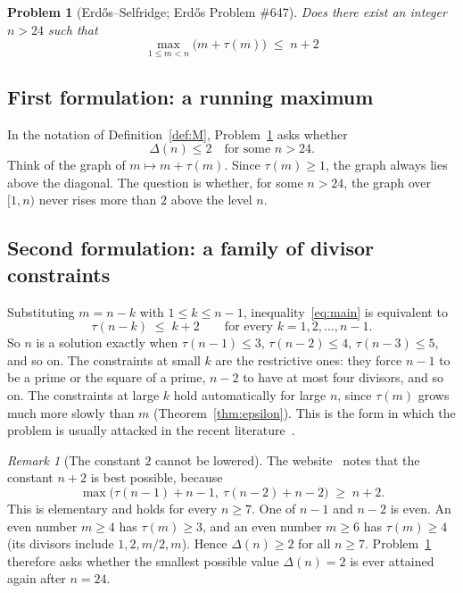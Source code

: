 \documentclass[11pt]{amsart}
\theoremstyle{plain}
\newtheorem{problem}[theorem]{Problem}
\theoremstyle{definition}
\theoremstyle{remark}
\newtheorem{remark}[theorem]{Remark}
\numberwithin{equation}{section}
\newcommand{\Dl}{\Delta}        %
\begin{document}
\begin{problem}[Erd\H{o}s--Selfridge; Erd\H{o}s Problem \#647]\label{prob:main}
Does there exist an integer $n>24$ such that
\begin{equation}\label{eq:main}
  \boxed{\;\max_{1\le m<n}\bigl(m+\tau(m)\bigr)\;\le\; n+2\;}
\end{equation}
\end{problem}

\subsection{First formulation: a running maximum}
In the notation of Definition~\ref{def:M}, Problem~\ref{prob:main} asks whether
\begin{equation}\label{eq:delta}
  \Dl(n)\le 2 \quad\text{for some } n>24.
\end{equation}
Think of the graph of $m\mapsto m+\tau(m)$. Since $\tau(m)\ge 1$, the graph always lies above the diagonal. The question is whether, for some $n>24$, the graph over $[1,n)$ never rises more than $2$ above the level $n$.

\subsection{Second formulation: a family of divisor constraints}
Substituting $m=n-k$ with $1\le k\le n-1$, inequality~\eqref{eq:main} is equivalent to
\begin{equation}\label{eq:shifts}
  \tau(n-k)\;\le\; k+2 \qquad\text{for every } k=1,2,\dots,n-1.
\end{equation}
So $n$ is a solution exactly when $\tau(n-1)\le 3$, $\tau(n-2)\le 4$, $\tau(n-3)\le 5$, and so on. The constraints at small $k$ are the restrictive ones: they force $n-1$ to be a prime or the square of a prime, $n-2$ to have at most four divisors, and so on. The constraints at large $k$ hold automatically for large $n$, since $\tau(m)$ grows much more slowly than $m$ (Theorem~\ref{thm:epsilon}). This is the form in which the problem is usually attacked in the recent literature~\cite{Forum647,MianSiddique2026}.

\begin{remark}[The constant $2$ cannot be lowered]\label{rem:best-possible}
The website~\cite{Bloom647} notes that the constant $n+2$ is best possible, because
\begin{equation}\label{eq:best}
  \max\bigl(\tau(n-1)+n-1,\ \tau(n-2)+n-2\bigr)\;\ge\; n+2 .
\end{equation}
This is elementary and holds for every $n\ge 7$. One of $n-1$ and $n-2$ is even. An even number $m\ge 4$ has $\tau(m)\ge 3$, and an even number $m\ge 6$ has $\tau(m)\ge 4$ (its divisors include $1,2,m/2,m$). Hence $\Dl(n)\ge 2$ for all $n\ge 7$. Problem~\ref{prob:main} therefore asks whether the smallest possible value $\Dl(n)=2$ is ever attained again after $n=24$.
\end{remark}
\end{document}
